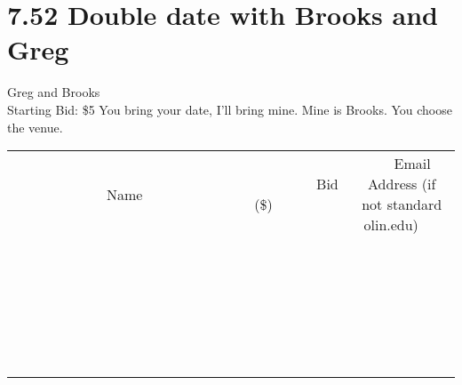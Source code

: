 \documentclass[11pt]{article}
\begin{document}
\section*{7.52 Double date with Brooks and Greg}
Greg and Brooks
\\
Starting Bid: \$5
\newline
You bring your date, I'll bring mine. Mine is Brooks. You choose the venue.
\\[6ex]
\begin{tabular}{c c c}
~~~~~~~~~~~~~Name~~~~~~~~~~~~~ & ~~~~~~~~~Bid (\$)~~~~~~~~~  & ~~~Email Address (if not standard olin.edu)~~~\\
 & & \\
\hline
 & & \\
\hline
 & & \\
\hline
 & & \\
\hline
 & & \\
\hline
 & & \\
\hline
 & & \\
\hline
 & & \\
\hline
 & & \\
\hline
 & & \\
\hline
 & & \\
\hline
 & & \\
\hline
 & & \\
\hline
 & & \\
\hline
 & & \\
\hline
 & & \\
\hline
 & & \\
\hline
 & & \\
\hline
 & & \\
\hline
 & & \\
\hline
 & & \\
\hline
 & & \\
\hline
 & & \\
\hline
 & & \\
\hline
 & & \\
\hline
 & & \\
\hline
\end{tabular}
\newpage
\end{document}
